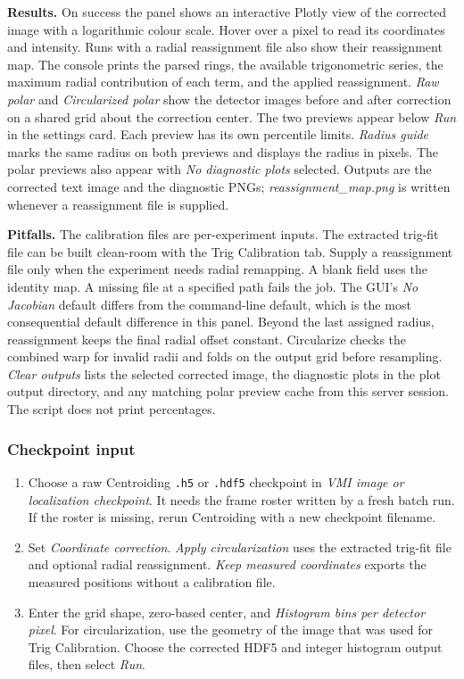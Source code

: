 \documentclass[11pt,a4paper]{article}
\newcommand{\code}[1]{\texttt{#1}}
\begin{document}
\textbf{Results.} On success the panel shows an interactive Plotly view of
the corrected image with a logarithmic colour scale. Hover over a pixel to
read its coordinates and intensity. Runs with a radial reassignment file
also show their reassignment map. The console prints the parsed rings,
the available trigonometric series, the maximum radial contribution of each
term, and the applied reassignment.
\emph{Raw polar} and \emph{Circularized polar} show the detector images
before and after correction on a shared grid about the correction center.
The two previews appear below \emph{Run} in the settings card.
Each preview has its own percentile limits. \emph{Radius guide} marks
the same radius on both previews and displays the radius in pixels.
The polar previews also appear with \emph{No diagnostic plots} selected.
Outputs are the corrected text image and
the diagnostic PNGs; \emph{reassignment\_map.png} is written whenever a
reassignment file is supplied.

\textbf{Pitfalls.} The calibration files are per-experiment inputs. The
extracted trig-fit file can be built clean-room with the Trig Calibration tab.
Supply a reassignment file only when the experiment needs radial remapping.
A blank field uses the identity map. A missing file at a specified path fails
the job. The GUI's \emph{No Jacobian} default differs from the command-line default, which
is the most consequential default difference in this panel. Beyond the last
assigned radius, reassignment keeps the final radial offset constant.
Circularize checks the combined warp for invalid radii and folds on the output
grid before resampling. \emph{Clear outputs} lists the selected corrected image,
the diagnostic plots in the plot output directory, and any matching polar
preview cache from this server session. The script does not print percentages.

\subsubsection*{Checkpoint input}

\begin{enumerate}
  \item Choose a raw Centroiding \code{.h5} or \code{.hdf5} checkpoint in
        \emph{VMI image or localization checkpoint}. It needs the frame roster
        written by a fresh batch run. If the roster is missing, rerun
        Centroiding with a new checkpoint filename.
  \item Set \emph{Coordinate correction}. \emph{Apply circularization}
        uses the extracted trig-fit file and optional radial reassignment.
        \emph{Keep measured coordinates} exports the measured positions
        without a calibration file.
  \item Enter the grid shape, zero-based center, and \emph{Histogram bins
        per detector pixel}. For circularization, use the geometry of the
        image that was used for Trig Calibration. Choose the corrected HDF5
        and integer histogram output files, then select \emph{Run}.
\end{enumerate}
\end{document}
